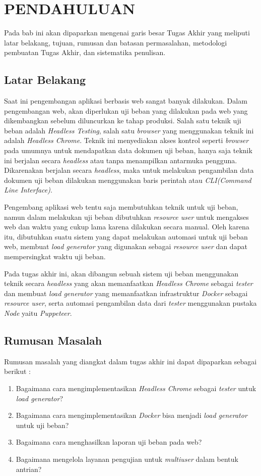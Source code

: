 \chapter{PENDAHULUAN}
	Pada bab ini akan dipaparkan mengenai garis besar Tugas Akhir yang meliputi latar belakang, tujuan, rumusan dan batasan permasalahan, metodologi pembuatan Tugas Akhir, dan sistematika penulisan.
        
	\section{Latar Belakang}
		Saat ini pengembangan aplikasi berbasis web sangat banyak dilakukan. Dalam pengembangan web, akan diperlukan uji beban yang dilakukan pada web yang dikembangkan sebelum diluncurkan ke tahap produksi. Salah satu teknik uji beban adalah \textit{Headless Testing}, salah satu \textit{browser} yang menggunakan teknik ini adalah \textit{Headless Chrome}. Teknik ini menyediakan akses kontrol seperti \textit{browser} pada umumnya untuk mendapatkan data dokumen uji beban, hanya saja teknik ini berjalan secara \textit{headless} atau tanpa menampilkan antarmuka pengguna. Dikarenakan berjalan secara \textit{headless}, maka untuk melakukan pengambilan data dokumen uji beban dilakukan menggunakan baris perintah atau \textit{CLI(Command Line Interface)}.
		
		\indent Pengembang aplikasi web tentu saja membutuhkan teknik untuk uji beban, namun dalam melakukan uji beban dibutuhkan \textit{resource user} untuk mengakses web dan waktu yang cukup lama karena dilakukan secara manual. Oleh karena itu, dibutuhkan suatu sistem yang dapat melakukan automasi untuk uji beban web, membuat \textit{load generator} yang digunakan sebagai \textit{resource user} dan dapat mempersingkat waktu uji beban.
		
		\indent Pada tugas akhir ini, akan dibangun sebuah sistem uji beban menggunakan teknik secara \textit{headless} yang akan memanfaatkan \textit{Headless Chrome} sebagai \textit{tester} dan membuat \textit{load generator} yang memanfaatkan infrastruktur \textit{Docker} sebagai \textit{resource user}, serta automasi pengambilan data dari \textit{tester} menggunakan pustaka \textit{Node} yaitu \textit{Puppeteer}\cite{puppeteer}.

	\section{Rumusan Masalah}
       	Rumusan masalah yang diangkat dalam tugas akhir ini dapat dipaparkan sebagai berikut :
		\begin{enumerate}
			\item Bagaimana cara mengimplementasikan \textit{Headless Chrome} sebagai \textit{tester} untuk \textit{load generator}?
			\item Bagaimana cara mengimplementasikan \textit{Docker} bisa menjadi \textit{load generator} untuk uji beban?
			\item Bagaimana cara menghasilkan laporan uji beban pada web?
			\item Bagaimana mengelola layanan pengujian untuk \textit{multiuser} dalam bentuk antrian?
		\end{enumerate}

